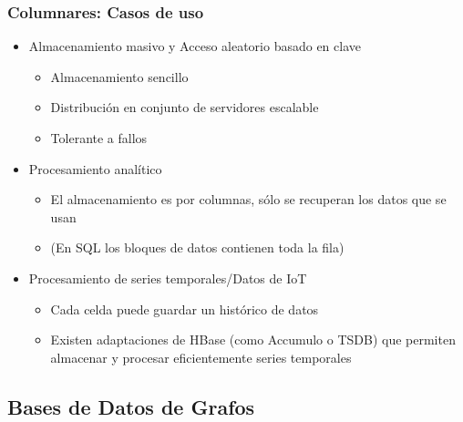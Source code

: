 \documentclass[14pt]{beamer}
\begin{document}




\begin{frame}[allowframebreaks]
  \frametitle{Columnares: Casos de uso}
  \begin{itemize}
  \item Almacenamiento masivo y Acceso aleatorio basado en clave
    \begin{itemize}
    \item Almacenamiento sencillo
    \item Distribución en conjunto de servidores escalable
    \item Tolerante a fallos
    \end{itemize}
  \item Procesamiento analítico
    \begin{itemize}
    \item El almacenamiento es por columnas, sólo se recuperan los datos
      que se usan
    \item (En SQL los bloques de datos contienen toda la fila)
    \end{itemize}
\framebreak
  \item Procesamiento de series temporales/Datos de IoT
    \begin{itemize}
    \item Cada celda puede guardar un histórico de datos
    \item Existen adaptaciones de HBase (como Accumulo o TSDB) que permiten
      almacenar y procesar eficientemente series temporales
    \end{itemize}
  \end{itemize}
\end{frame}

\subsection{Bases de Datos de Grafos}
\end{document}
